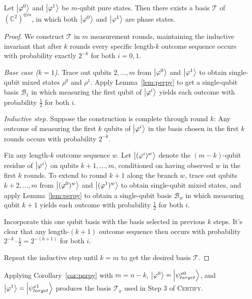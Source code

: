 \begin{corollary}\label{cor:perpy}
    Let $\ket{\varphi^0}$ and $\ket{\varphi^1}$ be $m$-qubit pure states. Then there exists a basis $\mathcal{T}$ of $(\mathbb{C}^2)^{\otimes m}$, in which both $\ket{\varphi^0}$ and $\ket{\varphi^1}$ are phase states.
\end{corollary}

\begin{proof}
    We construct $\mathcal{T}$ in $m$ measurement rounds, maintaining the inductive invariant that after $k$ rounds every specific length-$k$ outcome sequence occurs with probability exactly $2^{-k}$ for both $i = 0, 1$.

    \medskip
    \noindent\textit{Base case ($k=1$).} Trace out qubits $2, \ldots, m$ from $\ket{\varphi^0}$ and $\ket{\varphi^1}$ to obtain single-qubit mixed states $\rho^0$ and $\rho^1$. Apply Lemma~\ref{lem:perpy} to get a single-qubit basis $\mathcal{B}_1$ in which measuring the first qubit of $\ket{\varphi^i}$ yields each outcome with probability $\tfrac{1}{2}$ for both $i$.

    \medskip
    \noindent\textit{Inductive step.} Suppose the construction is complete through round $k$:
    Any outcome of measuring the first $k$ qubits of $\ket{\varphi^i}$ in the basis 
    chosen in the first $k$ rounds occurs with probability $2^{-k}$.
    
    Fix any length-$k$ outcome sequence $w$. 
    Let $\ket{(\varphi^i)^w}$ denote the $(m-k)$-qubit residue of $\ket{\varphi^i}$ on qubits 
    $k+1, \ldots, m$, conditioned on having observed $w$ in the first $k$ rounds. 
    To extend to round $k+1$ along the branch $w$, trace out qubits $k+2, \ldots, m$ 
    from $\ket{(\varphi^0)^w}$ and $\ket{(\varphi^1)^w}$ to obtain single-qubit mixed states, 
    and apply Lemma~\ref{lem:perpy} to obtain a single-qubit basis $\mathcal{B}_w$ 
    in which measuring qubit $k+1$ yields each outcome with probability $\tfrac{1}{2}$ 
    for both $i$. 
    
    Incorporate this one qubit basis with the basis selected in previous $k$ steps. 
    It's clear that any length-$(k+1)$ outcome sequence then occurs 
    with probability $2^{-k}\cdot\tfrac{1}{2} = 2^{-(k+1)}$ for both $i$.

    Repeat the inductive step until $k=m$ to get the desired basis $\mathcal{T}$.
\end{proof}

Applying Corollary~\ref{cor:perpy} with $m = n-k$, $\ket{\varphi^0} = \ket{\psi_{target}^{x0}}$, and $\ket{\varphi^1} = \ket{\psi_{target}^{x1}}$ produces the basis $\mathcal{T}_x$ used in Step 3 of \textsc{Certify}.


